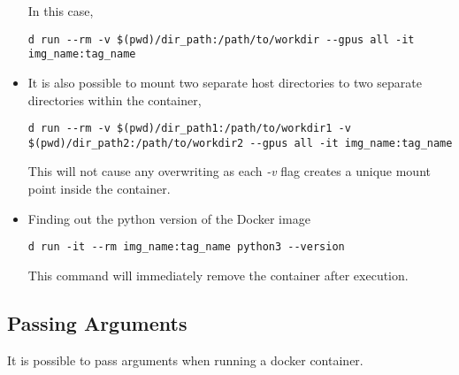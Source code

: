 \documentclass[12pt, a4paper]{scrbook}
\numberwithin{equation}{section}
\theoremstyle{definition}
\theoremstyle{definition}
\begin{document}
\begin{itemize}
		In this case, 
		
		\begin{lstlisting}[style=mystylebash, label=alg:docker_run__mount_dir_rm, xleftmargin=\parindent]
			d run --rm -v $(pwd)/dir_path:/path/to/workdir --gpus all -it img_name:tag_name
		\end{lstlisting}
		
		\item It is also possible to mount two separate host directories to two separate directories within the container,
		
		\begin{lstlisting}[style=mystylebash, label=alg:docker_run__mount_sev_dir_rm, xleftmargin=\parindent]
			d run --rm -v $(pwd)/dir_path1:/path/to/workdir1 -v $(pwd)/dir_path2:/path/to/workdir2 --gpus all -it img_name:tag_name
		\end{lstlisting}
		
		This will not cause any overwriting as each \textit{-v} flag creates a unique mount point inside the container. 
		
		\item Finding out the python version of the Docker image
		
		\begin{lstlisting}[style=mystylebash, label=alg:docker__python_version, xleftmargin=\parindent]
			d run -it --rm img_name:tag_name python3 --version
		\end{lstlisting}
		
		This command will immediately remove the container after execution.
		
	\end{itemize}
	
	\subsection{Passing Arguments}
	
	It is possible to pass arguments when running a docker container. 
	
\end{document}
